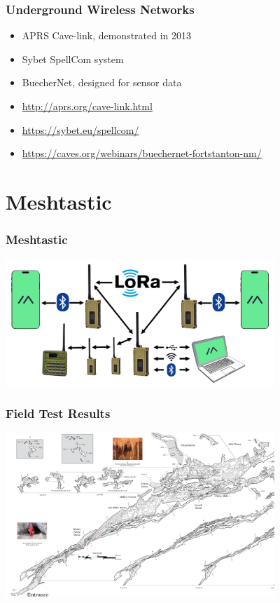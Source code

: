 \documentclass{beamer}
\begin{document}
\begin{frame}
\frametitle{Underground Wireless Networks}

\begin{itemize}
	\item APRS Cave-link, demonstrated in 2013
	\item Sybet SpellCom system
	\item BuecherNet, designed for sensor data
	\item \tiny\url{http://aprs.org/cave-link.html}
	\item \tiny\url{https://sybet.eu/spellcom/}
	\item \tiny\url{https://caves.org/webinars/buechernet-fortstanton-nm/}
\end{itemize}
\end{frame}

\section{Meshtastic}

\begin{frame}
\frametitle{Meshtastic}

\begin{center}
\includegraphics[width=4.0in]{../images/lora-topology-2.png}
\end{center}

\end{frame}


\begin{frame}
	\frametitle{Field Test Results}

\begin{center}
\includegraphics[width=4.0in]{../images/New-River-June-4-2024.png}
\end{center}

\end{frame}
\end{document}
